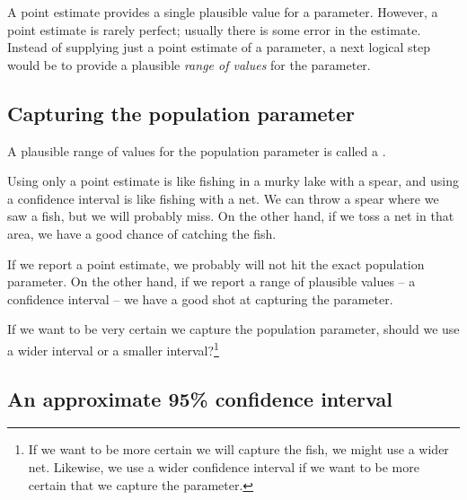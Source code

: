 
A point estimate provides a single plausible value for a parameter. However, a point estimate is rarely perfect; usually there is some error in the estimate. Instead of supplying just a point estimate of a parameter, a next logical step would be to provide a plausible \emph{range of values} for the parameter.


\subsection{Capturing the population parameter}

A plausible range of values for the population parameter is called a .

Using only a point estimate is like fishing in a murky lake with a spear, and using a confidence interval is like fishing with a net. We can throw a spear where we saw a fish, but we will probably miss. On the other hand, if we toss a net in that area, we have a good chance of catching the fish.

If we report a point estimate, we probably will not hit the exact population parameter. On the other hand, if we report a range of plausible values -- a confidence interval -- we have a good shot at capturing the parameter. 

\begin{exercise}
If we want to be very certain we capture the population parameter, should we use a wider interval or a smaller interval?\footnote{If we want to be more certain we will capture the fish, we might use a wider net. Likewise, we use a wider confidence interval if we want to be more certain that we capture the parameter.}
\end{exercise}


\textC{\pagebreak}


\subsection{An approximate 95\% confidence interval}

